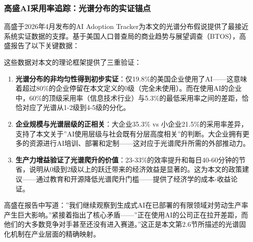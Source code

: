 \documentclass[12pt,a4paper]{ctexart}
\begin{document}
\subsubsection{高盛AI采用率追踪：光谱分布的实证锚点}

高盛于2026年4月发布的AI Adoption Tracker为本文的光谱分布假说提供了最接近系统实证数据的支撑。基于美国人口普查局的商业趋势与展望调查（BTOS），高盛报告了以下关键数据：

\begin{center}
\end{center}

这些数据对本文的理论框架提供了三重验证：

\begin{enumerate}
\item \textbf{光谱分布的非均匀性得到初步实证}：仅19.8\%的美国企业使用了AI——这意味着超过80\%的企业停留在本文定义的0级（完全未使用）。而在使用AI的企业中，60\%的顶级采用率（信息技术行业）与5.3\%的最低采用率之间的差距，恰恰对应了光谱从1-2级到4-5级的分化。
\item \textbf{企业规模与光谱层级的正相关}：大企业35.3\% vs 小企业21.5\%的采用率差异，支持了本文关于''AI使用层级与社会既有分层高度相关''的判断。大企业拥有更多的资源进行AI培训、部署和定制——这对应于光谱爬升所需的外部推动力。
\item \textbf{生产力增益验证了光谱爬升的价值}：23-33\%的效率提升和每日40-60分钟的节省，说明从0级到2级以上的跃迁带来的经济效益是显著的。这为本文的政策建议——通过教育和开源降低光谱爬升门槛——提供了经济学的成本-收益论证。
\end{enumerate}

高盛在报告中写道：''我们继续观察到生成式AI在已部署的有限领域对劳动生产率产生巨大影响。''紧接着指出了核心矛盾——''正在使用AI的公司正在拉开差距，而他们的大多数竞争对手甚至还没有进入赛道。''这正是本文第2.6节所描述的光谱固化机制在产业层面的精确映射。
\end{document}
